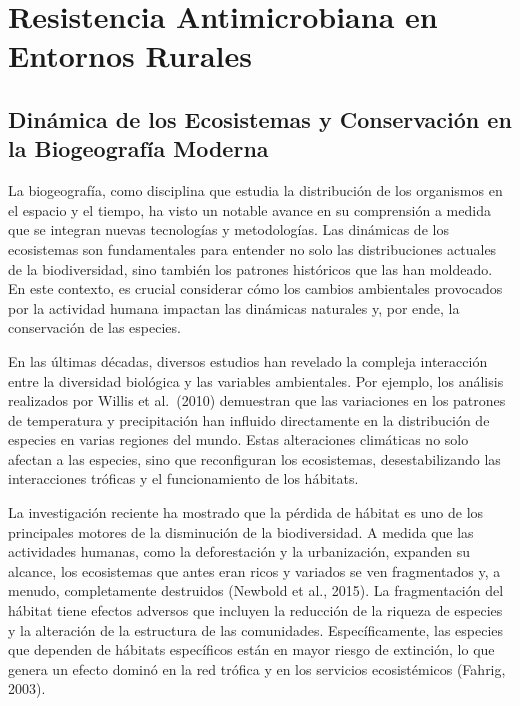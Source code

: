 \documentclass[
  letterpaper,
  DIV=11,
  numbers=noendperiod,
  oneside]{scrreprt}
\begin{document}
\chapter{Resistencia Antimicrobiana en Entornos
Rurales}\label{resistencia-antimicrobiana-en-entornos-rurales}

\section{Dinámica de los Ecosistemas y Conservación en la Biogeografía
Moderna}\label{dinuxe1mica-de-los-ecosistemas-y-conservaciuxf3n-en-la-biogeografuxeda-moderna}

La biogeografía, como disciplina que estudia la distribución de los
organismos en el espacio y el tiempo, ha visto un notable avance en su
comprensión a medida que se integran nuevas tecnologías y metodologías.
Las dinámicas de los ecosistemas son fundamentales para entender no solo
las distribuciones actuales de la biodiversidad, sino también los
patrones históricos que las han moldeado. En este contexto, es crucial
considerar cómo los cambios ambientales provocados por la actividad
humana impactan las dinámicas naturales y, por ende, la conservación de
las especies.

En las últimas décadas, diversos estudios han revelado la compleja
interacción entre la diversidad biológica y las variables ambientales.
Por ejemplo, los análisis realizados por Willis et al.~(2010) demuestran
que las variaciones en los patrones de temperatura y precipitación han
influido directamente en la distribución de especies en varias regiones
del mundo. Estas alteraciones climáticas no solo afectan a las especies,
sino que reconfiguran los ecosistemas, desestabilizando las
interacciones tróficas y el funcionamiento de los hábitats.

La investigación reciente ha mostrado que la pérdida de hábitat es uno
de los principales motores de la disminución de la biodiversidad. A
medida que las actividades humanas, como la deforestación y la
urbanización, expanden su alcance, los ecosistemas que antes eran ricos
y variados se ven fragmentados y, a menudo, completamente destruidos
(Newbold et al., 2015). La fragmentación del hábitat tiene efectos
adversos que incluyen la reducción de la riqueza de especies y la
alteración de la estructura de las comunidades. Específicamente, las
especies que dependen de hábitats específicos están en mayor riesgo de
extinción, lo que genera un efecto dominó en la red trófica y en los
servicios ecosistémicos (Fahrig, 2003).
\end{document}
